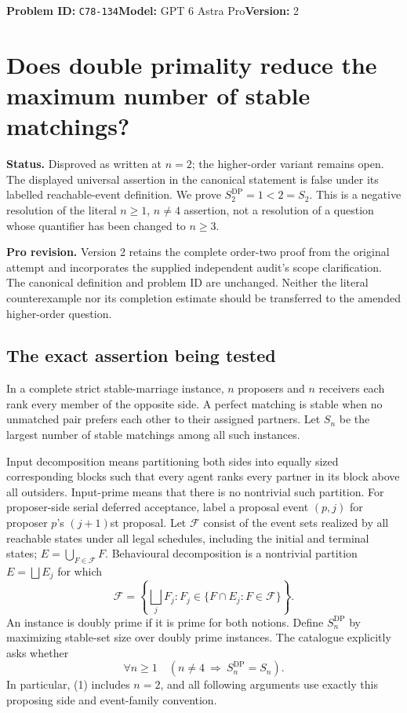 \documentclass[11pt,a4paper]{article}
\begin{document}
\noindent\textbf{Problem ID:} \texttt{C78-134}\quad\textbf{Model:} GPT 6 Astra Pro\quad\textbf{Version:} 2\par
\section*{Does double primality reduce the maximum number of stable matchings?}

\textbf{Status.} Disproved as written at $n=2$; the higher-order variant remains open. The displayed universal assertion in the canonical statement is false under its labelled reachable-event definition. We prove $S_2^{\mathrm{DP}}=1<2=S_2$. This is a negative resolution of the literal $n\geq1$, $n\ne4$ assertion, not a resolution of a question whose quantifier has been changed to $n\geq3$.

\textbf{Pro revision.} Version 2 retains the complete order-two proof from the original attempt and incorporates the supplied independent audit's scope clarification. The canonical definition and problem ID are unchanged. Neither the literal counterexample nor its completion estimate should be transferred to the amended higher-order question.

\subsection*{The exact assertion being tested}
In a complete strict stable-marriage instance, $n$ proposers and $n$ receivers each rank every member of the opposite side. A perfect matching is stable when no unmatched pair prefers each other to their assigned partners. Let $S_n$ be the largest number of stable matchings among all such instances.

Input decomposition means partitioning both sides into equally sized corresponding blocks such that every agent ranks every partner in its block above all outsiders. Input-prime means that there is no nontrivial such partition. For proposer-side serial deferred acceptance, label a proposal event $(p,j)$ for proposer $p$'s $(j+1)$st proposal. Let $\mathcal F$ consist of the event sets realized by all reachable states under all legal schedules, including the initial and terminal states; $E=\bigcup_{F\in\mathcal F}F$. Behavioural decomposition is a nontrivial partition $E=\bigsqcup E_j$ for which
\[
 \mathcal F=\left\{\bigsqcup_jF_j:
                  F_j\in\{F\cap E_j:F\in\mathcal F\}\right\}.
\]
An instance is doubly prime if it is prime for both notions. Define $S_n^{\mathrm{DP}}$ by maximizing stable-set size over doubly prime instances. The catalogue explicitly asks whether
\[
 \forall n\geq1\quad(n\ne4\ \Longrightarrow\ S_n^{\mathrm{DP}}=S_n).\tag{1}
\]
In particular, (1) includes $n=2$, and all following arguments use exactly this proposing side and event-family convention.
\end{document}
